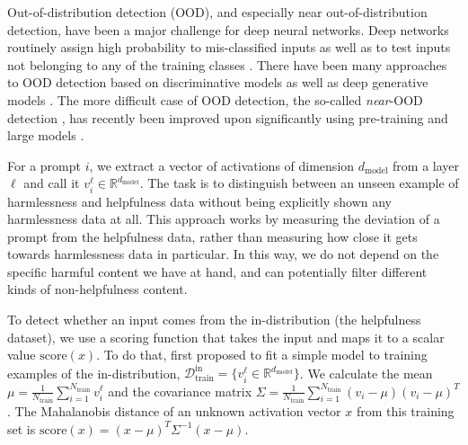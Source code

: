 Out-of-distribution detection (OOD), and especially near out-of-distribution detection, have been a major challenge for deep neural networks. Deep networks routinely assign high probability to mis-classified inputs \cite{https://doi.org/10.48550/arxiv.1706.04599, https://doi.org/10.48550/arxiv.1612.01474} as well as to test inputs not belonging to any of the training classes \cite{https://doi.org/10.48550/arxiv.1412.1897}. There have been many approaches to OOD detection based on discriminative models \cite{https://doi.org/10.48550/arxiv.1610.02136, https://doi.org/10.48550/arxiv.1807.03888, https://doi.org/10.48550/arxiv.1706.02690, https://doi.org/10.48550/arxiv.2006.10108} as well as deep generative models \cite{https://doi.org/10.48550/arxiv.1902.02767, https://doi.org/10.48550/arxiv.2003.12506}. The more difficult case of OOD detection, the so-called \textit{near}-OOD detection \cite{https://doi.org/10.48550/arxiv.2007.05566}, has recently been improved upon significantly using pre-training and large models \cite{fort2021exploring}.

For a prompt $i$, we extract a vector of activations of dimension $d_\mathrm{model}$ from a layer $\ell$ and call it $v_i^{\ell} \in \mathbb{R}^{d_\mathrm{model}}$. The task is to distinguish between an unseen example of harmlessness and helpfulness data without being explicitly shown any harmlessness data at all. This approach works by measuring the deviation of a prompt from the helpfulness data, rather than measuring how close it gets towards harmlessness data in particular. In this way, we do not depend on the specific harmful content we have at hand, and can potentially filter different kinds of non-helpfulness content.

To detect whether an input comes from the in-distribution (the helpfulness dataset), we use a scoring function that takes the input and maps it to a scalar value $\mathrm{score}(x)$. To do that, \cite{https://doi.org/10.48550/arxiv.1807.03888} first proposed to fit a simple model to training examples of the in-distribution, $\mathcal{D}_{\mathrm{train}}^{\mathrm{in}} = \{ v_i^{\ell} \in \mathbb{R}^{d_\mathrm{model}} \}$. We calculate the mean $\mu = \frac{1}{N_{\mathrm{train}}} \sum_{i=1}^{N_\mathrm{train}} v_i^{\ell}$ and the covariance matrix $\Sigma = \frac{1}{N_{\mathrm{train}}} \sum_{i=1}^{N_{\mathrm{train}}}\left(v_i-\mu \right)(v_i-\mu)^T$. The Mahalanobis distance of an unknown activation vector $x$ from this training set is $\mathrm{score}(x) = (x-\mu)^T\Sigma^{-1}(x-\mu)$.

